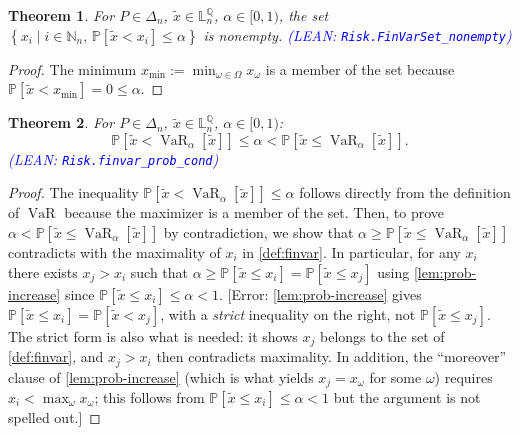 \documentclass[letterpaper]{article}
\theoremstyle{plain}
\newtheorem{theorem}{Theorem}[subsection]
\theoremstyle{definition}
\theoremstyle{remark}
\newcommand{\Nats}{\mathbb{N}}
\newcommand{\PP}{\mathbb{P}}
\DeclareMathOperator{\finvar}{VaR}
\newcommand{\cc}[1]{\textcolor{ccolor}{[#1]}}
\newcommand{\lean}[1]{\textcolor{blue}{(\emph{LEAN}: \texttt{#1})}}
\newcommand{\leanok}{}
\begin{document}
\begin{theorem} \label{thm:finvarset-nonempty}
For $P\in \Delta_n$, $\tilde{x}\in \mathbb{L}_n^{\mathbb{Q}}$, $\alpha\in [0,1)$, the set
$\left\{ x_i \mid i\in \Nats_n,\, \PP \left[ \tilde{x} < x_i \right] \le \alpha  \right\}$ is nonempty.
\lean{Risk.FinVarSet\_nonempty} \leanok
\end{theorem}
\begin{proof}
The minimum $x_{\min} := \min_{\omega\in \Omega} x_{\omega}$ is a member of the set because $\PP[\tilde{x} < x_{\min}] = 0 \le \alpha$.
\end{proof}

\begin{theorem} \label{thm:finvar-prob-cond}
For $P\in \Delta_n$, $\tilde{x}\in \mathbb{L}_n^{\mathbb{Q}}$, $\alpha\in [0,1)$:
  \[
    \PP\left[\tilde{x} <  \finvar_{\alpha }[\tilde{x}]\right]
    \le \alpha
    < \PP\left[\tilde{x} \le \finvar_{\alpha }[\tilde{x}] \right].
  \]
 \lean{Risk.finvar\_prob\_cond} \leanok
\end{theorem}
\begin{proof}
The inequality $\PP\left[\tilde{x} <  \finvar_{\alpha }[\tilde{x}]\right] \le \alpha $ follows directly from the definition of $\finvar$ because the maximizer is a member of the set. Then, to prove $\alpha < \PP\left[\tilde{x} \le \finvar_{\alpha }[\tilde{x}] \right]$ by contradiction, we show that $\alpha \ge \PP\left[\tilde{x} \le \finvar_{\alpha }[\tilde{x}] \right]$ contradicts with the maximality of $x_i$ in \cref{def:finvar}. In particular, for any $x_i$ there exists $x_j > x_i$ such that $\alpha \ge \PP\left[\tilde{x} \le x_i \right] =  \PP\left[\tilde{x} \le x_j \right]$  using \cref{lem:prob-increase} since $\PP\left[\tilde{x} \le x_i \right] \le \alpha < 1$.
\cc{Error: \cref{lem:prob-increase} gives $\PP[\tilde{x}\le x_i] = \PP[\tilde{x} < x_j]$, with a \emph{strict} inequality on the right, not $\PP[\tilde{x}\le x_j]$. The strict form is also what is needed: it shows $x_j$ belongs to the set of \cref{def:finvar}, and $x_j > x_i$ then contradicts maximality. In addition, the ``moreover'' clause of \cref{lem:prob-increase} (which is what yields $x_j = x_{\omega}$ for some $\omega$) requires $x_i < \max_{\omega} x_{\omega}$; this follows from $\PP[\tilde{x}\le x_i]\le \alpha<1$ but the argument is not spelled out.}
\end{proof}
\end{document}

